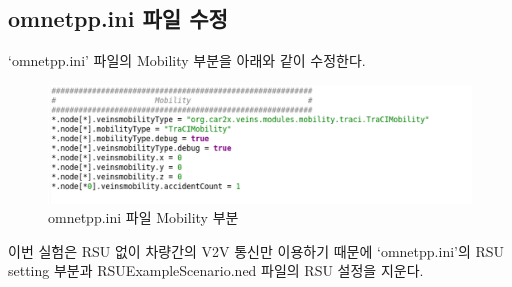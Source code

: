 \subsection*{omnetpp.ini 파일 수정}
    ‘omnetpp.ini’ 파일의 Mobility 부분을 아래와 같이 수정한다.
    \vspace{-3mm}
    \begin{figure}[!h]\centering 
        \includegraphics[width=.80\textwidth]{image/week14/1-7.png}
        \caption{\footnotesize
        omnetpp.ini 파일 Mobility 부분}
        \vspace{-10pt}
    \end{figure}

    이번 실험은 RSU 없이 차량간의 V2V 통신만 이용하기 때문에 ‘omnetpp.ini’의 RSU setting 부분과 RSUExampleScenario.ned 파일의 RSU 설정을 지운다.

\newpage
